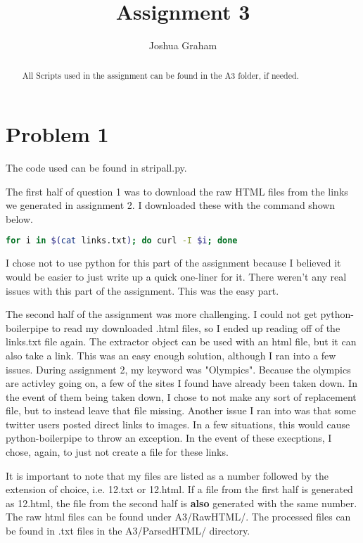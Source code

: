 \documentclass[11pt]{report}
\begin{document}
\title{Assignment 3}
\author{Joshua Graham}

\maketitle
\pagebreak
\begin{abstract}
All Scripts used in the assignment can be found in the A3 folder, if needed.

\end{abstract}

\section{Problem 1}

The code used can be found in stripall.py.

The first half of question 1 was to download the raw HTML files from the links we generated in assignment 2. I downloaded these with the command shown below. 
\begin{lstlisting}[language=bash]
for i in $(cat links.txt); do curl -I $i; done
\end{lstlisting}

I chose not to use python for this part of the assignment because I believed it would be easier to just write up a quick one-liner for it. There weren't any real issues with this part of the assignment. This was the easy part.

The second half of the assignment was more challenging. I could not get python-boilerpipe to read my downloaded .html files, so I ended up reading off of the links.txt file again. The extractor object can be used with an html file, but it can also take a link. This was an easy enough solution, although I ran into a few issues. During assignment 2, my keyword was "Olympics". Because the olympics are activley going on, a few of the sites I found have already been taken down. In the event of them being taken down, I chose to not make any sort of replacement file, but to instead leave that file missing. Another issue I ran into was that some twitter users posted direct links to images. In a few situations, this would cause python-boilerpipe to throw an exception. In the event of these execptions, I chose, again, to just not create a file for these links.

It is important to note that my files are listed as a number followed by the extension of choice, i.e. 12.txt or 12.html. If a file from the first half is generated as 12.html, the file from the second half is \textbf{also} generated with the same number. The raw html files can be found under A3/RawHTML/. The processed files can be found in .txt files in the A3/ParsedHTML/ directory.
\end{document}
